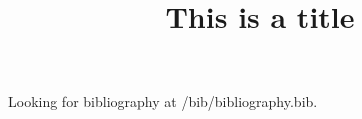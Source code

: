 \documentclass[11pt]{article}
\begin{document}
Looking for bibliography at \rootdir/bib/bibliography.bib.
\title{This is a title}

\end{document}
